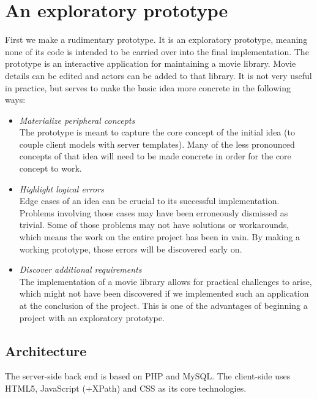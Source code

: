 \documentclass[thesis.tex]{subfiles}
\begin{document}
\chapter{An exploratory prototype}
\label{chap:first}
First we make a rudimentary prototype. It is an exploratory prototype,
meaning none of its code is intended to be carried over into the final
implementation.
The prototype is an interactive application for maintaining a movie
library. Movie details can be edited and actors can be added to that library.
It is not very useful in practice, but serves to make the basic idea more
concrete in the following ways:

\begin{itemize}
	\label{list:prototype-motivation}
	\item \emph{Materialize peripheral concepts}\\
	The prototype is meant to capture the core concept of the initial idea
	(to couple client models with server templates).
	Many of the less pronounced concepts of that idea will need to be made
	concrete in order for the core concept to work.
	\item \emph{Highlight logical errors}\\
	Edge cases of an idea can be crucial to its successful implementation.
	Problems involving those cases may have been erroneously dismissed as trivial.
	Some of those problems may not have solutions or workarounds, which
	means the work on the entire project has been in vain. By making a working
	prototype, those errors will be discovered early on.
	\item \emph{Discover additional requirements}\\
	The implementation of a movie library allows for practical challenges to
	arise, which might not have been discovered if we implemented such an
	application at the conclusion of the project. This is one of the advantages
	of beginning a project with an exploratory prototype.
\end{itemize}

\section{Architecture}

The server-side back end is based on PHP and MySQL. The client-side uses
HTML5, JavaScript (+XPath) and CSS as its core technologies.
\end{document}
